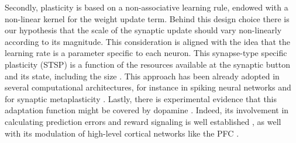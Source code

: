 Secondly, plasticity is based on a non-associative learning rule, endowed with a non-linear kernel for the weight update term.
Behind this design choice there is our hypothesis that the scale of the synaptic update should vary non-linearly according to its magnitude.
This consideration is aligned with the idea that the learning rate is a parameter specific to each neuron. This synapse-type specific plasticity (STSP) \cite{larsenSynapsetypespecificPlasticityLocal2015} is a function of the resources available at the synaptic button and its state, including the size \cite{blackmanTargetcellspecificShorttermPlasticity2013, bartolHippocampalSpineHead2015, arielIntrinsicVariabilityPv2012}.
This approach has been already adopted in several computational architectures, for instance in spiking neural networks \cite{inglisModulationDopamineAdaptive2021} and for synaptic metaplasticity \cite{iigayaAdaptiveLearningDecisionmaking2016}.
Lastly, there is experimental evidence that this adaptation function might be covered by dopamine \cite{toblerAdaptiveCodingReward2005}.
Indeed, its involvement in calculating prediction errors and reward signaling is well established \cite{schultzNeuralSubstratePrediction1997}, as well with its modulation of  high-level cortical networks like the PFC \cite{didomenicoDopaminergicModulationPrefrontal2023, lohaniDopamineModulationPrefrontal2019, dardenneRolePrefrontalCortex2012}.


